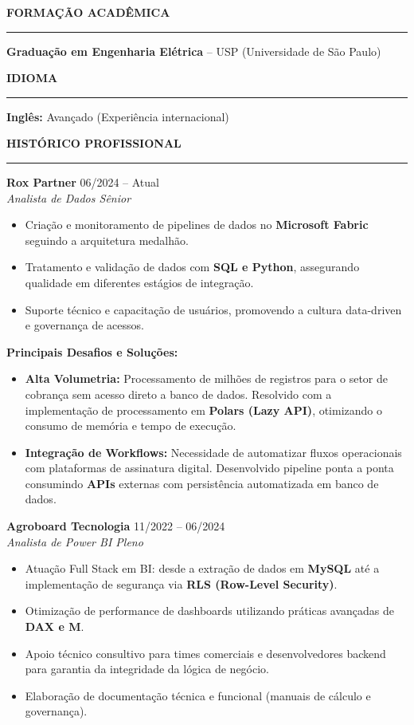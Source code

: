 \documentclass[11pt,a4paper]{article}
\newcommand{\resumosection}[1]{
    \vspace{4mm}
    {\large\textbf{\MakeUppercase{#1}}} %
    \vspace{1mm}
    \hrule %
    \vspace{4mm}    
    \vspace{-2mm}
}
\begin{document}
\resumosection{FORMAÇÃO ACADÊMICA}
\noindent \textbf{Graduação em Engenharia Elétrica} -- USP (Universidade de São Paulo)

\resumosection{IDIOMA}
\noindent \textbf{Inglês:} Avançado (Experiência internacional)

\resumosection{HISTÓRICO PROFISSIONAL}

\noindent \textbf{Rox Partner} \hfill 06/2024 -- Atual \\
\textit{Analista de Dados Sênior}
\begin{itemize}[leftmargin=*, noitemsep]
    \item Criação e monitoramento de pipelines de dados no \textbf{Microsoft Fabric} seguindo a arquitetura medalhão.
    \item Tratamento e validação de dados com \textbf{SQL e Python}, assegurando qualidade em diferentes estágios de integração.
    \item Suporte técnico e capacitação de usuários, promovendo a cultura data-driven e governança de acessos.
\end{itemize}

\vspace{2mm}
\noindent \textbf{Principais Desafios e Soluções:}
\begin{itemize}[leftmargin=*, noitemsep]
    \item \textbf{Alta Volumetria:} Processamento de milhões de registros para o setor de cobrança sem acesso direto a banco de dados. Resolvido com a implementação de processamento em \textbf{Polars (Lazy API)}, otimizando o consumo de memória e tempo de execução.
    \item \textbf{Integração de Workflows:} Necessidade de automatizar fluxos operacionais com plataformas de assinatura digital. Desenvolvido pipeline ponta a ponta consumindo \textbf{APIs} externas com persistência automatizada em banco de dados.
\end{itemize}

\vspace{2mm}

\noindent \textbf{Agroboard Tecnologia} \hfill 11/2022 -- 06/2024 \\
\textit{Analista de Power BI Pleno}
\begin{itemize}[leftmargin=*, noitemsep]
    \item Atuação Full Stack em BI: desde a extração de dados em \textbf{MySQL} até a implementação de segurança via \textbf{RLS (Row-Level Security)}.
    \item Otimização de performance de dashboards utilizando práticas avançadas de \textbf{DAX e M}.
    \item Apoio técnico consultivo para times comerciais e desenvolvedores backend para garantia da integridade da lógica de negócio.
    \item Elaboração de documentação técnica e funcional (manuais de cálculo e governança).
\end{itemize}
\end{document}
